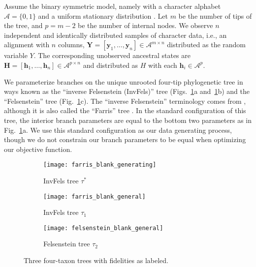 \documentclass[11pt]{article}
\newcommand{\alphabet}{\mathcal{A}}
\newcommand{\fullAlignment}{\mathbf{Y}}
\newcommand{\alignmentColumn}{\mathbf{y}}
\newcommand{\alignmentColumnRV}{Y}
\newcommand{\fullAncestralStates}{\mathbf{H}}
\newcommand{\ancestralStateColumn}{\mathbf{h}}
\newcommand{\ancestralStateColumnRV}{H}
\newcommand{\nCols}{n}
\newcommand{\nSiteRows}{m}
\newcommand{\nAncestralStateRows}{p}
\begin{document}
Assume the binary symmetric model, namely with a character alphabet $\alphabet=\{0,1\}$ and a uniform stationary distribution \citep{Semple2003-em}.
Let $\nSiteRows$ be the number of tips of the tree, and $\nAncestralStateRows = \nSiteRows-2$ be the number of internal nodes.
We observe $\nCols$ independent and identically distributed samples of character data, i.e., an alignment with $\nCols$ columns, $\fullAlignment=[\alignmentColumn_1,\ldots,\alignmentColumn_\nCols]\in\alphabet^{\nSiteRows\times\nCols}$ distributed as the random variable $\alignmentColumnRV$.
The corresponding unobserved ancestral states are $\fullAncestralStates=[\ancestralStateColumn_1,\ldots,\ancestralStateColumn_\nCols]\in\alphabet^{\nAncestralStateRows\times\nCols}$ and distributed as $\ancestralStateColumnRV$ with each $\ancestralStateColumn_i\in\alphabet^\nAncestralStateRows$.

We parameterize branches on the unique unrooted four-tip phylogenetic tree in ways known as the ``inverse Felsenstein (InvFels)'' tree (Figs.~\ref{fig:farris-fels-top}a and~\ref{fig:farris-fels-top}b) and the ``Felsenstein'' tree (Fig.~\ref{fig:farris-fels-top}c).
The ``inverse Felsenstein'' terminology comes from \citet{Swofford2001-hr}, although it is also called the ``Farris'' tree \citep{Siddall1998-hq, Felsenstein2004}.
In the standard configuration of this tree, the interior branch parameters are equal to the bottom two parameters as in Fig.~\ref{fig:farris-fels-top}a.
We use this standard configuration as our data generating process, though we do not constrain our branch parameters to be equal when optimizing our objective function.

\begin{figure}
\centering
\begin{subfigure}{.32\linewidth}
\centering
\texttt{[image: farris\_blank\_generating]}
\caption[short]{InvFels tree $\tau^*$}
\end{subfigure}
\begin{subfigure}{.32\linewidth}
\centering
\texttt{[image: farris\_blank\_general]}
\caption[short]{InvFels tree $\tau_1$}
\end{subfigure}
\begin{subfigure}{.32\linewidth}
\centering
\texttt{[image: felsenstein\_blank\_general]}
\caption[short]{Felsenstein tree $\tau_2$}
\end{subfigure}
\caption{Three four-taxon trees with fidelities as labeled.}
\label{fig:farris-fels-top}
\end{figure}
\end{document}
